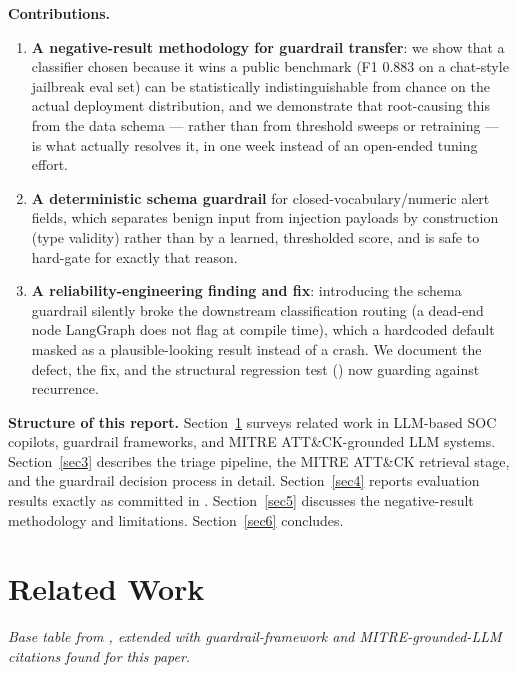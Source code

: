 \documentclass[twocolumn]{svjour3}
\begin{document}
\noindent\textbf{Contributions.}
\begin{enumerate}
\item \textbf{A negative-result methodology for guardrail transfer}: we show that a classifier chosen because it wins a public benchmark (F1 0.883 on a chat-style jailbreak eval set) can be statistically indistinguishable from chance on the actual deployment distribution, and we demonstrate that root-causing this from the data schema --- rather than from threshold sweeps or retraining --- is what actually resolves it, in one week instead of an open-ended tuning effort.
\item \textbf{A deterministic schema guardrail} for closed-vocabulary/numeric alert fields, which separates benign input from injection payloads by construction (type validity) rather than by a learned, thresholded score, and is safe to hard-gate for exactly that reason.
\item \textbf{A reliability-engineering finding and fix}: introducing the schema guardrail silently broke the downstream classification routing (a dead-end node LangGraph does not flag at compile time), which a hardcoded default masked as a plausible-looking result instead of a crash. We document the defect, the fix, and the structural regression test () now guarding against recurrence.
\end{enumerate}

\noindent\textbf{Structure of this report.} Section~\ref{sec2} surveys related work in LLM-based SOC copilots, guardrail frameworks, and MITRE ATT\&CK-grounded LLM systems. Section~\ref{sec3} describes the triage pipeline, the MITRE ATT\&CK retrieval stage, and the guardrail decision process in detail. Section~\ref{sec4} reports evaluation results exactly as committed in . Section~\ref{sec5} discusses the negative-result methodology and limitations. Section~\ref{sec6} concludes.

\section{Related Work}\label{sec2}

\noindent\textit{Base table from , extended with guardrail-framework and MITRE-grounded-LLM citations found for this paper.}
\end{document}
